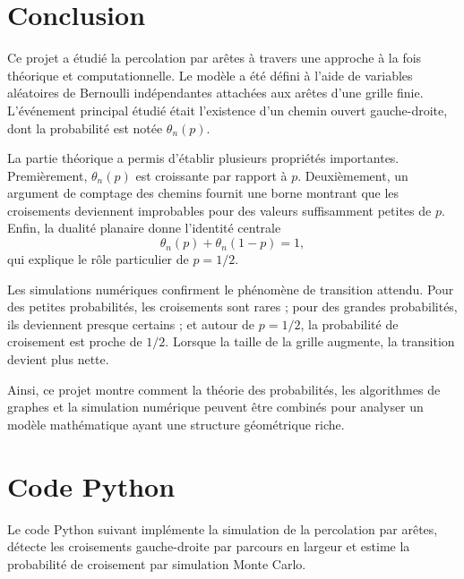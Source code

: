 \documentclass[11pt,a4paper]{report}
\begin{document}
\chapter*{Conclusion}

Ce projet a étudié la percolation par arêtes à travers une approche à la fois théorique et computationnelle. Le modèle a été défini à l'aide de variables aléatoires de Bernoulli indépendantes attachées aux arêtes d'une grille finie. L'événement principal étudié était l'existence d'un chemin ouvert gauche-droite, dont la probabilité est notée $\theta_n(p)$.

La partie théorique a permis d'établir plusieurs propriétés importantes. Premièrement, $\theta_n(p)$ est croissante par rapport à $p$. Deuxièmement, un argument de comptage des chemins fournit une borne montrant que les croisements deviennent improbables pour des valeurs suffisamment petites de $p$. Enfin, la dualité planaire donne l'identité centrale
\[
\theta_n(p)+\theta_n(1-p)=1,
\]
qui explique le rôle particulier de $p=1/2$.

Les simulations numériques confirment le phénomène de transition attendu. Pour des petites probabilités, les croisements sont rares ; pour des grandes probabilités, ils deviennent presque certains ; et autour de $p=1/2$, la probabilité de croisement est proche de $1/2$. Lorsque la taille de la grille augmente, la transition devient plus nette.

Ainsi, ce projet montre comment la théorie des probabilités, les algorithmes de graphes et la simulation numérique peuvent être combinés pour analyser un modèle mathématique ayant une structure géométrique riche.

\appendix

\chapter{Code Python}

Le code Python suivant implémente la simulation de la percolation par arêtes, détecte les croisements gauche-droite par parcours en largeur et estime la probabilité de croisement par simulation Monte Carlo.
\end{document}
